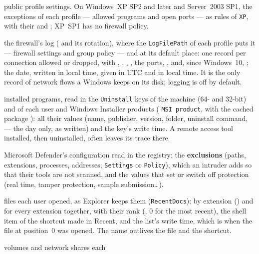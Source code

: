 \documentclass[11pt,a4paper,oneside]{report}
\begin{document}
\begin{description}[style=nextline,leftmargin=1.2em]
        public profile settings. On Windows~XP SP2 and later and Server~2003
        SP1, the exceptions of each profile --- allowed programs and open
        ports --- as rules of  \texttt{XP}, with their
         and ; XP~SP1 has no firewall policy.
  \item[\fichier{firewall\_log.json}] the firewall's log
        ( and its  rotation), where the
        \texttt{LogFilePath} of each profile puts it — firewall settings and
        group policy — and at its default place: one record per connection
        allowed or dropped, with , ,
        , , the ports,
        ,  and, since Windows~10,
        ; the date, written in local time, given in UTC and
        in local time. It is the only record of network flows a Windows keeps
        on its disk; logging is off by default.
  \item[\fichier{installed\_programs.json}] installed programs, read in the
        \texttt{Uninstall} keys of the machine (64- and 32-bit) and of each user
        and Windows Installer products ( \texttt{MSI product},
        with the cached package ): all their values (name, publisher, version, folder,
        uninstall command,  --- the day only, as written) and
        the key's write time. A remote access tool installed, then uninstalled,
        often leaves its trace there.
  \item[\fichier{defender\_configuration.json}] Microsoft Defender's
        configuration read in the registry: the \textbf{exclusions} (paths,
        extensions, processes, addresses;  \texttt{Settings} or
        \texttt{Policy}), which an intruder adds so that their tools are not
        scanned, and the values that set or switch off protection (real time,
        tamper protection, sample submission\ldots).
  \item[\fichier{explorer\_recent\_docs.json}] files each user opened, as
        Explorer keeps them (\texttt{RecentDocs}): by extension
        () and for every extension together, with their rank
        (, 0 for the most recent), the shell item of the
        shortcut made in Recent, and the list's write time, which is when the
        file at position~0 was opened. The name outlives the file and the
        shortcut.
  \item[\fichier{mount\_points.json}] volumes and network shares each

\end{description}
\end{document}

